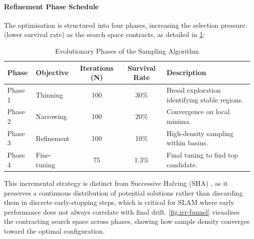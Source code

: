 \paragraph{Refinement Phase Schedule}
The optimisation is structured into four phases, increasing the selection pressure (lower survival rate) as the search space contracts, as detailed in \cref{tab:phases}:

\begin{table}[h]
\centering
\caption{Evolutionary Phases of the Sampling Algorithm}
\label{tab:phases}
\begin{tabularx}{\textwidth}{@{} l l c c X @{}}
\toprule
\textbf{Phase} & \textbf{Objective} & \textbf{Iterations (N)} & \textbf{Survival Rate} & \textbf{Description} \\ \midrule
Phase 1 & Thinning & 100 & 30\% & Broad exploration identifying stable regions. \\
Phase 2 & Narrowing & 100 & 20\% & Convergence on local minima. \\
Phase 3 & Refinement & 100 & 10\% & High-density sampling within basins. \\
Phase 4 & Fine-tuning & 75 & 1.3\% & Final tuning to find top candidate. \\ \bottomrule
\end{tabularx}
\end{table}

This incremental strategy is distinct from Successive Halving (SHA) \cite{jamiesonNonstochasticBestArm2015}, as it preserves a continuous distribution of potential solutions rather than discarding them in discrete early-stopping steps, which is critical for SLAM where early performance does not always correlate with final drift. \cref{fig:irr-funnel} visualises the contracting search space across phases, showing how sample density converges toward the optimal configuration.

